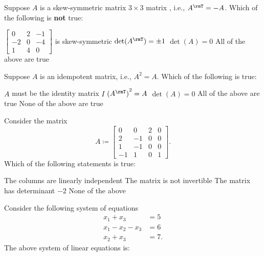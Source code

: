 \begin{questions}
  \newpage
  \question[10] Suppose $A$ is a skew-symmetric matrix $3\times 3$ matrix ,
  i.e., $A^\rmT=-A$. Which of the following is \textbf{not} true:
  \\
  \begin{choices}
    \choice $
    \left[
      \begin{smallmatrix}
        0&2&-1\\
        -2&0&-4\\
        1&4&0
      \end{smallmatrix}
    \right]$ is skew-symmetric%
    \choice $\det(A^\rmT)=\pm 1$%
    \choice $\det(A)=0$%
    \choice All of the above are true
  \end{choices}
  \newpage
  \question[10] Suppose $A$ is an idempotent matrix, i.e., $A^2=A$. Which
  of the following is true:
  \\
  \begin{choices}
    \choice $A$ must be the identity matrix $I$
    \choice ${(A^\rmT)}^2=A$
    \choice $\det(A)=0$
    \choice All of the above are true
    \choice None of the above are true
  \end{choices}
  \newpage
  \question[10] Consider the matrix
  \[
    A\coloneq
    \begin{bmatrix}
      0&0&2&0\\
      2&-1&0&0\\
      1&-1&0&0\\
      -1&1&0&1
    \end{bmatrix}.
  \]
  Which of the following statements is true:
  \\
  \begin{choices}
    \choice The columns are linearly independent
    \choice The matrix is not invertible
    \choice The matrix has determinant $-2$
    \choice None of the above
  \end{choices}
  \newpage
  \question[10] Consider the following system of equations
  \begin{align*}
    x_1+x_3&=5\\
    x_1-x_2-x_3&=6\\
    x_2+x_3&=7.
  \end{align*}
  The above system of linear equations is:
  \\
  \begin{choices}

\end{choices}
\end{questions}
